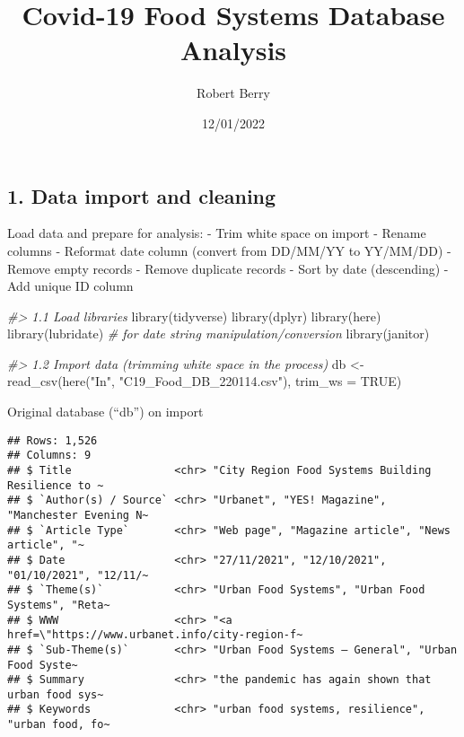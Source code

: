 \documentclass[
]{article}
\title{Covid-19 Food Systems Database Analysis}
\author{Robert Berry}
\date{12/01/2022}
\newenvironment{Shaded}{\begin{snugshade}}{\end{snugshade}}
\newcommand{\AttributeTok}[1]{\textcolor[rgb]{0.77,0.63,0.00}{#1}}
\newcommand{\CommentTok}[1]{\textcolor[rgb]{0.56,0.35,0.01}{\textit{#1}}}
\newcommand{\ConstantTok}[1]{\textcolor[rgb]{0.00,0.00,0.00}{#1}}
\newcommand{\FunctionTok}[1]{\textcolor[rgb]{0.00,0.00,0.00}{#1}}
\newcommand{\NormalTok}[1]{#1}
\newcommand{\OtherTok}[1]{\textcolor[rgb]{0.56,0.35,0.01}{#1}}
\newcommand{\StringTok}[1]{\textcolor[rgb]{0.31,0.60,0.02}{#1}}
\begin{document}
\maketitle

{
\setcounter{tocdepth}{4}
\tableofcontents
}
\hypertarget{data-import-and-cleaning}{%
\subsection{1. Data import and
cleaning}\label{data-import-and-cleaning}}

Load data and prepare for analysis: - Trim white space on import -
Rename columns - Reformat date column (convert from DD/MM/YY to
YY/MM/DD) - Remove empty records - Remove duplicate records - Sort by
date (descending) - Add unique ID column

\begin{Shaded}
\begin{Highlighting}[]
\CommentTok{\#\textgreater{} 1.1 Load libraries }
\FunctionTok{library}\NormalTok{(tidyverse)}
\FunctionTok{library}\NormalTok{(dplyr)}
\FunctionTok{library}\NormalTok{(here)}
\FunctionTok{library}\NormalTok{(lubridate) }\CommentTok{\# for date string manipulation/conversion}
\FunctionTok{library}\NormalTok{(janitor)}

\CommentTok{\#\textgreater{} 1.2 Import data (trimming white space in the process)}
\NormalTok{db }\OtherTok{\textless{}{-}} \FunctionTok{read\_csv}\NormalTok{(}\FunctionTok{here}\NormalTok{(}\StringTok{"In"}\NormalTok{, }\StringTok{"C19\_Food\_DB\_220114.csv"}\NormalTok{), }\AttributeTok{trim\_ws =} \ConstantTok{TRUE}\NormalTok{)}
\end{Highlighting}
\end{Shaded}

Original database (``db'') on import

\begin{verbatim}
## Rows: 1,526
## Columns: 9
## $ Title                <chr> "City Region Food Systems Building Resilience to ~
## $ `Author(s) / Source` <chr> "Urbanet", "YES! Magazine", "Manchester Evening N~
## $ `Article Type`       <chr> "Web page", "Magazine article", "News article", "~
## $ Date                 <chr> "27/11/2021", "12/10/2021", "01/10/2021", "12/11/~
## $ `Theme(s)`           <chr> "Urban Food Systems", "Urban Food Systems", "Reta~
## $ WWW                  <chr> "<a href=\"https://www.urbanet.info/city-region-f~
## $ `Sub-Theme(s)`       <chr> "Urban Food Systems – General", "Urban Food Syste~
## $ Summary              <chr> "the pandemic has again shown that urban food sys~
## $ Keywords             <chr> "urban food systems, resilience", "urban food, fo~
\end{verbatim}
\end{document}
